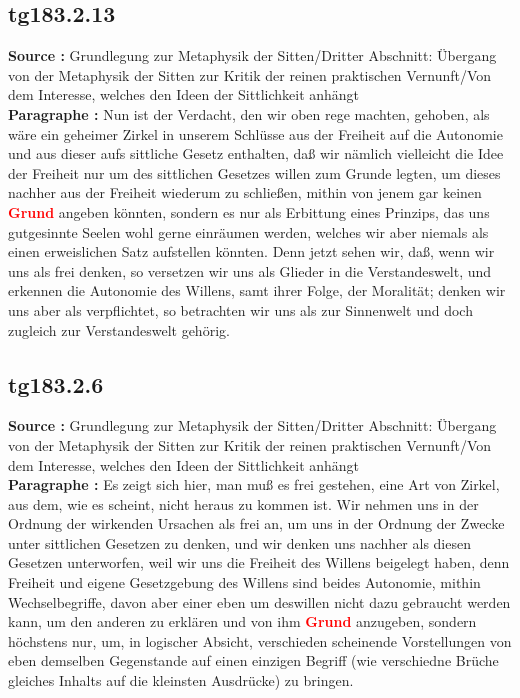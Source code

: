 \documentclass[a4paper,12pt,twoside]{book}
\newcommand{\match}[1]{\textcolor{red}{\textbf{#1}}}
\begin{document}
	\subsection*{tg183.2.13} 
	\textbf{Source : }Grundlegung zur Metaphysik der Sitten/Dritter Abschnitt: Übergang von der Metaphysik der Sitten zur Kritik der reinen praktischen Vernunft/Von dem Interesse, welches den Ideen der Sittlichkeit anhängt\\  
	
	\noindent\textbf{Paragraphe : }Nun ist der Verdacht, den wir oben rege machten, gehoben, als wäre ein geheimer Zirkel in unserem Schlüsse aus der Freiheit auf die Autonomie und aus dieser aufs sittliche Gesetz enthalten, daß wir nämlich vielleicht die Idee der Freiheit nur um des sittlichen Gesetzes willen zum Grunde legten, um dieses nachher aus der Freiheit wiederum zu schließen, mithin von jenem gar keinen \match{Grund} angeben könnten, sondern es nur als Erbittung eines Prinzips, das uns gutgesinnte Seelen wohl gerne einräumen werden, welches wir aber niemals als einen erweislichen Satz aufstellen könnten. Denn jetzt sehen wir, daß, wenn wir uns als frei denken, so versetzen wir uns als Glieder in die Verstandeswelt, und erkennen die Autonomie des Willens, samt ihrer Folge, der Moralität; denken wir uns aber als verpflichtet, so betrachten wir uns als zur Sinnenwelt und doch zugleich zur Verstandeswelt gehörig. 
	
	\subsection*{tg183.2.6} 
	\textbf{Source : }Grundlegung zur Metaphysik der Sitten/Dritter Abschnitt: Übergang von der Metaphysik der Sitten zur Kritik der reinen praktischen Vernunft/Von dem Interesse, welches den Ideen der Sittlichkeit anhängt\\  
	
	\noindent\textbf{Paragraphe : }Es zeigt sich hier, man muß es frei gestehen, eine Art von Zirkel, aus dem, wie es scheint, nicht heraus zu kommen ist. Wir nehmen uns in der Ordnung der wirkenden Ursachen  als frei an, um uns in der Ordnung der Zwecke unter sittlichen Gesetzen zu denken, und wir denken uns nachher als diesen Gesetzen unterworfen, weil wir uns die Freiheit des Willens beigelegt haben, denn Freiheit und eigene Gesetzgebung des Willens sind beides Autonomie, mithin Wechselbegriffe, davon aber einer eben um deswillen nicht dazu gebraucht werden kann, um den anderen zu erklären und von ihm \match{Grund} anzugeben, sondern höchstens nur, um, in logischer Absicht, verschieden scheinende Vorstellungen von eben demselben Gegenstande auf einen einzigen Begriff (wie verschiedne Brüche gleiches Inhalts auf die kleinsten Ausdrücke) zu bringen. 
	
\end{document}

